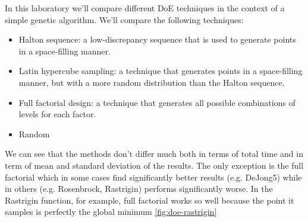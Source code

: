 In this laboratory we'll compare different DoE techniques in the context of a simple genetic algorithm. We'll compare the following techniques:
\begin{itemize}
    \item Halton sequence: a low-discrepancy sequence that is used to generate points in a space-filling manner.
    \item Latin hypercube sampling: a technique that generates points in a space-filling manner, but with a more random distribution than the Halton sequence.
    \item Full factorial design: a technique that generates all possible combinations of levels for each factor.
    \item Random
\end{itemize}

We can see that the methods don't differ much both in terms of total time and in term of mean and standard deviation of the results. The only exception is the full factorial which in some cases find significantly better results (e.g. DeJong5) while in others (e.g. Rosenbrock, Rastrigin) performs significantly worse. In the Rastrigin function, for example, full factorial works so well because the point it samples is perfectly the global minimum \ref{fig:doe-rastrigin}


